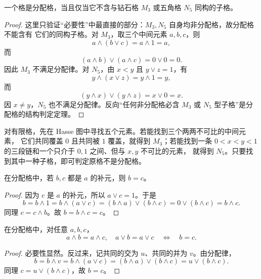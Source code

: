
\begin{theorem}[分配格的禁用子格判定]\label{forbidden-lattices}
  一个格是分配格，当且仅当它不含与钻石格 $M_3$ 或五角格 $N_5$ 同构的子格。
\end{theorem}

\begin{proof}
  这里只验证“必要性”中最直接的部分：$M_3,N_5$ 自身均非分配格，故分配格不能含有
  它们的同构子格。对 $M_3$，取三个中间元素 $a,b,c$，则
  \[
  a\wedge(b\vee c)=a\wedge1=a,
  \]
  而
  \[
  (a\wedge b)\vee(a\wedge c)=0\vee0=0.
  \]
  因此 $M_3$ 不满足分配律。对 $N_5$，由 $x<y$ 且 $y\vee z=1$，有
  \[
  y\wedge(x\vee z)=y\wedge1=y,
  \]
  而
  \[
  (y\wedge x)\vee(y\wedge z)=x\vee0=x.
  \]
  因 $x\ne y$，$N_5$ 也不满足分配律。反向“任何非分配格必含
  $M_3$ 或 $N_5$ 型子格”是分配格的结构判定定理。
\end{proof}

\begin{method}[禁用子格判定的使用]\label{forbidden-lattice-method}
  对有限格，先在 Hasse 图中寻找五个元素。若能找到三个两两不可比的中间元素，
  它们共同覆盖 $0$ 且共同被 $1$ 覆盖，就得到 $M_3$；若能找到一条
  $0<x<y<1$ 的三段链和一个只介于 $0,1$ 之间、但与 $x,y$ 不可比的元素，
  就得到 $N_5$。只要找到其中一种子格，即可判定原格不是分配格。
\end{method}

\begin{theorem}[分配格中补元唯一]\label{complement-unique}
  在分配格中，若 $b,c$ 都是 $a$ 的补元，则 $b=c$。
\end{theorem}

\begin{proof}
  因为 $c$ 是 $a$ 的补元，所以 $a\vee c=1$。于是
  \[
  b=b\wedge1=b\wedge(a\vee c)=(b\wedge a)\vee(b\wedge c)=0\vee(b\wedge c)=b\wedge c.
  \]
  同理 $c=c\wedge b$。故 $b=b\wedge c=c$。
\end{proof}

\begin{theorem}[分配格的分离性质]\label{distributive-separation}
  在分配格中，对任意 $a,b,c$，
  \[
  a\wedge b=a\wedge c,\quad a\vee b=a\vee c
  \quad\Longleftrightarrow\quad b=c.
  \]
\end{theorem}

\begin{proof}
  必要性显然。反过来，记共同的交为 $u$、共同的并为 $v$。由分配律，
  \[
  b=b\wedge v=b\wedge(a\vee c)=(b\wedge a)\vee(b\wedge c)
  =u\vee(b\wedge c).
  \]
  同理 $c=u\vee(b\wedge c)$，故 $b=c$。
\end{proof}

